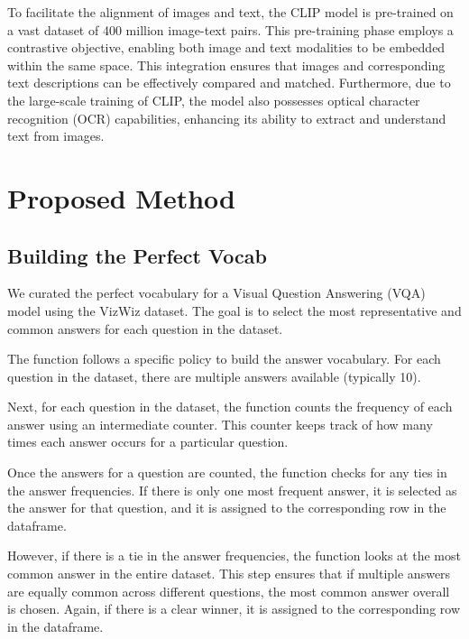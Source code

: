 \documentclass[final,5p,times,twocolumn,authoryear]{elsarticle}
\begin{document}
To facilitate the alignment of images and text, the CLIP model is pre-trained on a vast dataset of 400 million image-text pairs. This pre-training phase employs a contrastive objective, enabling both image and text modalities to be embedded within the same space. This integration ensures that images and corresponding text descriptions can be effectively compared and matched. Furthermore, due to the large-scale training of CLIP, the model also possesses optical character recognition (OCR) capabilities, enhancing its ability to extract and understand text from images.






\section{Proposed Method}
\subsection{Building the Perfect Vocab}

We curated the perfect vocabulary for a Visual Question Answering (VQA) model using the VizWiz dataset. The goal is to select the most representative and common answers for each question in the dataset.

The function follows a specific policy to build the answer vocabulary. For each question in the dataset, there are multiple answers available (typically 10).

Next, for each question in the dataset, the function counts the frequency of each answer using an intermediate counter. This counter keeps track of how many times each answer occurs for a particular question.

Once the answers for a question are counted, the function checks for any ties in the answer frequencies. If there is only one most frequent answer, it is selected as the answer for that question, and it is assigned to the corresponding row in the dataframe.

However, if there is a tie in the answer frequencies, the function looks at the most common answer in the entire dataset. This step ensures that if multiple answers are equally common across different questions, the most common answer overall is chosen. Again, if there is a clear winner, it is assigned to the corresponding row in the dataframe.
\end{document}
